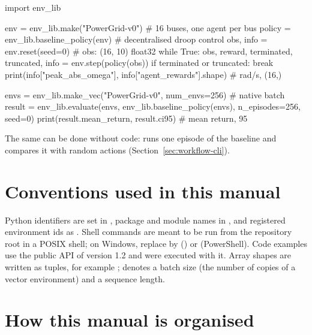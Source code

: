 \begin{pycode}
import env_lib

env = env_lib.make("PowerGrid-v0")              # 16 buses, one agent per bus
policy = env_lib.baseline_policy(env)           # decentralised droop control
obs, info = env.reset(seed=0)                   # obs: (16, 10) float32
while True:
    obs, reward, terminated, truncated, info = env.step(policy(obs))
    if terminated or truncated:
        break
print(info["peak_abs_omega"], info["agent_rewards"].shape)   # rad/s, (16,)

envs = env_lib.make_vec("PowerGrid-v0", num_envs=256)       # native batch
result = env_lib.evaluate(envs, env_lib.baseline_policy(envs),
                          n_episodes=256, seed=0)
print(result.mean_return, result.ci95)          # mean return, 95%
\end{pycode}

The same can be done without code:  runs one
episode of the baseline and 
compares it with random actions (Section~\ref{sec:workflow-cli}).

\section{Conventions used in this manual}\label{sec:intro-conventions}

Python identifiers are set in , package and module names in
, and registered environment ids as .
Shell commands are meant to be run from the repository root in a POSIX shell;
on Windows, replace  by 
() or  (PowerShell). Code examples use the
public API of version 1.2 and were executed with it. Array shapes are written
as tuples, for example ;  denotes a batch
size (the number of copies of a vector environment) and  a sequence
length.

\section{How this manual is organised}\label{sec:intro-organisation}


